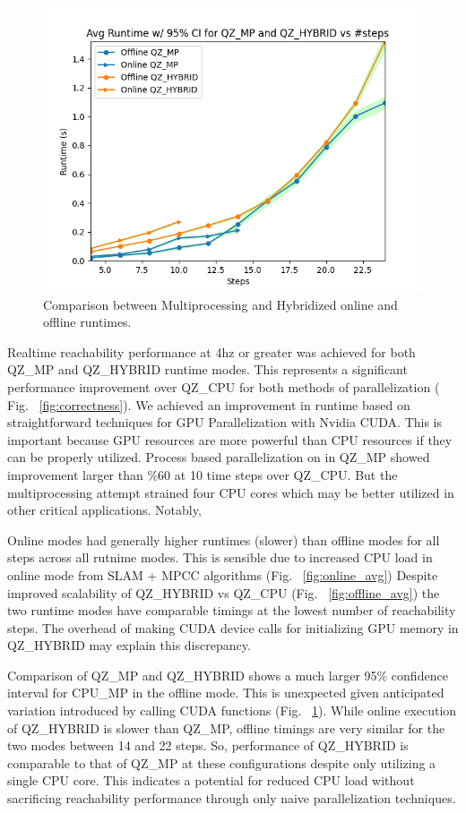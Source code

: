 \documentclass[runningheads]{llncs}
\begin{document}
\begin{figure}
\includegraphics[width=.48\textwidth]{profiler_out/avg_mp_hybrid_CI.png}
\caption{Comparison between Multiprocessing and Hybridized online and offline runtimes.} \label{fig:mp_hybrid_ci}
\end{figure}

Realtime reachability performance at 4hz or greater was achieved for both QZ\_MP and QZ\_HYBRID runtime modes. This represents a significant performance improvement over QZ\_CPU for both methods of parallelization ( Fig. ~\ref{fig:correctness}). We achieved an improvement in runtime based on straightforward techniques for GPU Parallelization with Nvidia CUDA. This is important because GPU resources are more powerful than CPU resources if they can be properly utilized. Process based parallelization on in QZ\_MP showed improvement larger than \%60 at 10 time steps over QZ\_CPU. But the multiprocessing attempt strained four CPU cores which may be better utilized in other critical applications. Notably, 

Online modes had generally higher runtimes (slower) than offline modes for all steps across all rutnime modes. This is sensible due to increased CPU load in online mode from SLAM + MPCC algorithms (Fig. ~\ref{fig:online_avg}) Despite improved scalability of QZ\_HYBRID vs QZ\_CPU (Fig. ~\ref{fig:offline_avg}) the two runtime modes have comparable timings at the lowest number of reachability steps. The overhead of making CUDA device calls for initializing GPU memory in QZ\_HYBRID may explain this discrepancy.

Comparison of QZ\_MP and QZ\_HYBRID shows a much larger 95\% confidence interval for CPU\_MP  in the offline mode. This is unexpected given anticipated variation introduced by calling CUDA functions (Fig. ~\ref{fig:mp_hybrid_ci}). While online execution of QZ\_HYBRID is slower than QZ\_MP, offline timings are very similar for the two modes between 14 and 22 steps. So, performance of QZ\_HYBRID is comparable to that of QZ\_MP at these configurations despite only utilizing a single CPU core. This indicates a potential for reduced CPU load without sacrificing reachability performance through only naive parallelization techniques.


%
%
%


%
%
\end{document}

